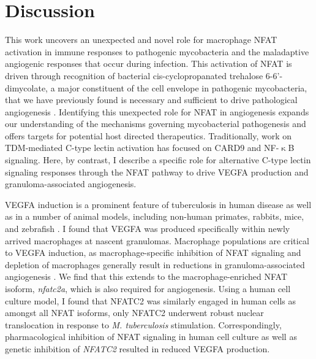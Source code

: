 \section{Discussion}\label{pap:disc}

This work uncovers an unexpected and novel role for macrophage NFAT activation in immune responses to pathogenic mycobacteria and the maladaptive angiogenic responses that occur during infection. This activation of NFAT is driven through recognition of bacterial cis\hyp{}cyclopropanated trehalose 6\hyp{}6'\hyp{}dimycolate, a major constituent of the cell envelope in pathogenic mycobacteria, that we have previously found is necessary and sufficient to drive pathological angiogenesis \citep{Walton2018}. Identifying this unexpected role for NFAT in angiogenesis expands our understanding of the mechanisms governing mycobacterial pathogenesis and offers targets for potential host directed therapeutics. Traditionally, work on TDM\hyp{}mediated C\hyp{}type lectin activation has focused on CARD9 and NF\hyp{}$\upkappa$B signaling. Here, by contrast, I describe a specific role for alternative C\hyp{}type lectin signaling responses through the NFAT pathway to drive VEGFA production and granuloma\hyp{}associated angiogenesis. 

VEGFA induction is a prominent feature of tuberculosis in human disease as well as in a number of animal models, including non\hyp{}human primates, rabbits, mice, and zebrafish \citep{Datta2015, Oehlers2015, Polena2016, Harding2019, Cronan2021, Gideon2022}. I found that VEGFA was produced specifically within newly arrived macrophages at nascent granulomas. Macrophage populations are critical to VEGFA induction, as macrophage\hyp{}specific inhibition of NFAT signaling and depletion of macrophages generally result in reductions in granuloma\hyp{}associated angiogenesis \citep{Oehlers2015}. We find that this extends to the macrophage\hyp{}enriched NFAT isoform, \textit{nfatc2a}, which is also required for angiogenesis. Using a human cell culture model, I found that NFATC2 was similarly engaged in human cells as amongst all NFAT isoforms, only NFATC2 underwent robust nuclear translocation in response to \textit{M. tuberculosis} stimulation. Correspondingly, pharmacological inhibition of NFAT signaling in human cell culture as well as genetic inhibition of \textit{NFATC2} resulted in reduced VEGFA production.

